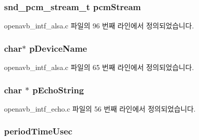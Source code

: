\subsubsection[{\texorpdfstring{pcm\+Stream}{pcmStream}}]{\setlength{\rightskip}{0pt plus 5cm}snd\+\_\+pcm\+\_\+stream\+\_\+t pcm\+Stream}\hypertarget{structpvt__data__t_afddbe34322b5c451479ff1fe39b8292d}{}\label{structpvt__data__t_afddbe34322b5c451479ff1fe39b8292d}


openavb\+\_\+intf\+\_\+alsa.\+c 파일의 96 번째 라인에서 정의되었습니다.

\subsubsection[{\texorpdfstring{p\+Device\+Name}{pDeviceName}}]{\setlength{\rightskip}{0pt plus 5cm}char$\ast$ p\+Device\+Name}\hypertarget{structpvt__data__t_ac8d9dc6d5b5eae731c087605a3780cc7}{}\label{structpvt__data__t_ac8d9dc6d5b5eae731c087605a3780cc7}


openavb\+\_\+intf\+\_\+alsa.\+c 파일의 65 번째 라인에서 정의되었습니다.

\subsubsection[{\texorpdfstring{p\+Echo\+String}{pEchoString}}]{\setlength{\rightskip}{0pt plus 5cm}char $\ast$ p\+Echo\+String}\hypertarget{structpvt__data__t_a34c8486df19a1f6a309547f1e8aba1e8}{}\label{structpvt__data__t_a34c8486df19a1f6a309547f1e8aba1e8}


openavb\+\_\+intf\+\_\+echo.\+c 파일의 56 번째 라인에서 정의되었습니다.

\subsubsection[{\texorpdfstring{period\+Time\+Usec}{periodTimeUsec}}]{ period\+Time\+Usec}\hypertarget{structpvt__data__t_a69ce66331b71bec8c96ed76d23b3ce1e}{}\label{structpvt__data__t_a69ce66331b71bec8c96ed76d23b3ce1e}


